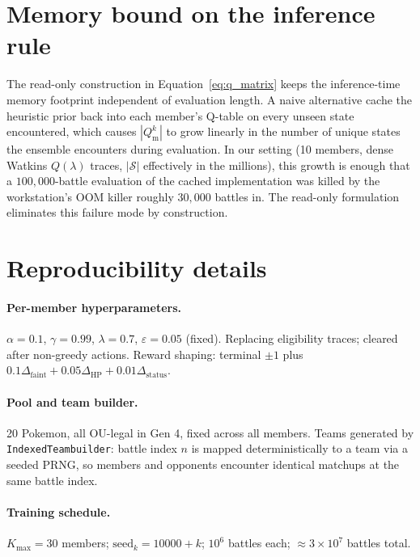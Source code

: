 \section{Memory bound on the inference rule}
\label{app:memory_bound}

The read-only construction in Equation~\ref{eq:q_matrix} keeps the
inference-time memory footprint independent of evaluation length. A
naive alternative cache the heuristic prior back into each member's
Q-table on every unseen state encountered, which causes
$|Q^k_{\text{m}}|$ to grow linearly in the number of unique states the
ensemble encounters during evaluation. In our setting (10 members, dense
Watkins $Q(\lambda)$ traces, $|\mathcal{S}|$ effectively in the
millions), this growth is enough that a $100{,}000$-battle evaluation
of the cached implementation was killed by the workstation's OOM
killer roughly $30{,}000$ battles in. The read-only formulation eliminates
this failure mode by construction.

\section{Reproducibility details}
\label{app:reproducibility}

\paragraph{Per-member hyperparameters.}
$\alpha = 0.1$, $\gamma = 0.99$, $\lambda = 0.7$, $\varepsilon = 0.05$
(fixed). Replacing eligibility traces; cleared after non-greedy actions.
Reward shaping: terminal $\pm 1$ plus
$0.1 \Delta_{\text{faint}} + 0.05 \Delta_{\text{HP}} + 0.01 \Delta_{\text{status}}$.

\paragraph{Pool and team builder.}
20 Pokemon, all OU-legal in Gen 4, fixed across all members. Teams
generated by \texttt{IndexedTeambuilder}: battle index $n$ is mapped
deterministically to a team via a seeded PRNG, so members and opponents
encounter identical matchups at the same battle index.

\paragraph{Training schedule.}
$K_{\max} = 30$ members; $\text{seed}_k = 10000 + k$; $10^6$ battles
each; $\approx 3 \times 10^7$ battles total.

